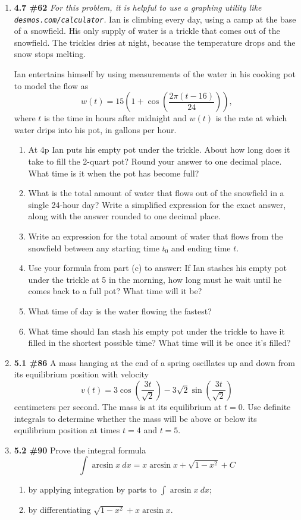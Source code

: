 \documentclass[%
]{article}
\begin{document}
\begin{enumerate}
\item {\bf 4.7 \#62}  {\it For this problem, it is helpful to use a graphing utility like \verb+desmos.com/calculator+.}  Ian is climbing every day, using a camp at the base of a snowfield.  His only supply of water is a trickle that comes out of the snowfield.  The trickles dries at night, because the temperature drops and the snow stops melting.

Ian entertains himself by using measurements of the water in his cooking pot to model the flow as 
\[
w(t)=15\left(1+\cos\left(\frac{2\pi(t-16)}{24} \right) \right),
\]
where $t$ is the time in hours after midnight and $w(t)$ is the rate at which water drips into his pot, in gallons per hour.
	\begin{enumerate}
	\item At 4p Ian puts his empty pot under the trickle.  About how long does it take to fill the 2-quart pot?  Round your answer to one decimal place.  What time is it when the pot has become full?
	\item What is the total amount of water that flows out of the snowfield in a single 24-hour day?  Write a simplified expression for the exact answer, along with the answer rounded to one decimal place.
	\item Write an expression for the total amount of water that flows from the snowfield between any starting time $t_0$ and ending time $t$.
	\item Use your formula from part (c) to answer: If Ian stashes his empty pot under the trickle at 5 in the morning, how long must he wait until he comes back to a full pot?  What time will it be?
	\item What time of day is the water flowing the fastest?
	\item What time should Ian stash his empty pot under the trickle to have it filled in the shortest possible time?  What time will it be once it's filled?
	\end{enumerate}

\item {\bf 5.1 \#86} A mass hanging at the end of a spring oscillates up and down from its equilibrium position with velocity 
\[
v(t)=3\cos\left(\frac{3t}{\sqrt 2}\right)-3\sqrt 2\sin\left(\frac{3t}{\sqrt 2}\right)
\]
centimeters per second.  The mass is at its equilibrium at $t=0$.  Use definite integrals to determine whether the mass will be above or below its equilibrium position at times $t=4$ and $t=5$.

\item {\bf 5.2 \#90} Prove the integral formula
\[
\int \arcsin x\ dx = x\arcsin x +\sqrt{1-x^2} + C
\]
	\begin{enumerate}
	\item by applying integration by parts to $\int \arcsin x\ dx$;
	\item by differentiating $\sqrt{1-x^2}+x\arcsin x$.
	\end{enumerate}
\end{enumerate}
\end{document}
